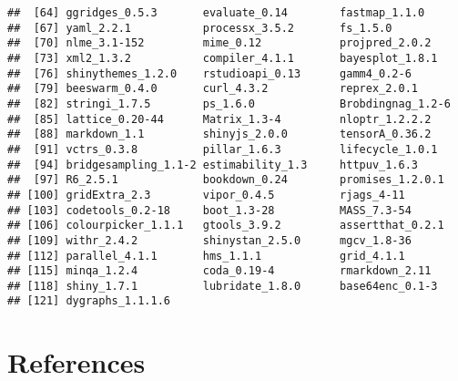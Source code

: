 \documentclass[
  11pt,
  english,
  ,doc,floatsintext]{apa6}
\begin{document}
\begin{verbatim}
##  [64] ggridges_0.5.3       evaluate_0.14        fastmap_1.1.0       
##  [67] yaml_2.2.1           processx_3.5.2       fs_1.5.0            
##  [70] nlme_3.1-152         mime_0.12            projpred_2.0.2      
##  [73] xml2_1.3.2           compiler_4.1.1       bayesplot_1.8.1     
##  [76] shinythemes_1.2.0    rstudioapi_0.13      gamm4_0.2-6         
##  [79] beeswarm_0.4.0       curl_4.3.2           reprex_2.0.1        
##  [82] stringi_1.7.5        ps_1.6.0             Brobdingnag_1.2-6   
##  [85] lattice_0.20-44      Matrix_1.3-4         nloptr_1.2.2.2      
##  [88] markdown_1.1         shinyjs_2.0.0        tensorA_0.36.2      
##  [91] vctrs_0.3.8          pillar_1.6.3         lifecycle_1.0.1     
##  [94] bridgesampling_1.1-2 estimability_1.3     httpuv_1.6.3        
##  [97] R6_2.5.1             bookdown_0.24        promises_1.2.0.1    
## [100] gridExtra_2.3        vipor_0.4.5          rjags_4-11          
## [103] codetools_0.2-18     boot_1.3-28          MASS_7.3-54         
## [106] colourpicker_1.1.1   gtools_3.9.2         assertthat_0.2.1    
## [109] withr_2.4.2          shinystan_2.5.0      mgcv_1.8-36         
## [112] parallel_4.1.1       hms_1.1.1            grid_4.1.1          
## [115] minqa_1.2.4          coda_0.19-4          rmarkdown_2.11      
## [118] shiny_1.7.1          lubridate_1.8.0      base64enc_0.1-3     
## [121] dygraphs_1.1.1.6
\end{verbatim}

\newpage

\hypertarget{references}{%
\section*{References}\label{references}}
\end{document}
